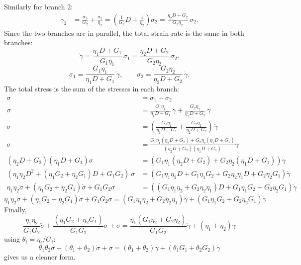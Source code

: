 Similarly for branch 2:
\begin{align*}
	\dot\gamma_2 &= \frac{\dot\sigma_2}{G_2} + \frac{\sigma_2}{\eta_2}
	= \left(\frac{1}{G_2}D + \frac{1}{\eta_2}\right)\sigma_2
	= \frac{\eta_2 D + G_2}{G_2\eta_2}\,\sigma_2.
\end{align*}
Since the two branches are in parallel, the total strain rate is the same in both branches:
\[
	\dot\gamma 
	= \frac{\eta_1 D + G_1}{G_1\eta_1}\,\sigma_1
	= \frac{\eta_2 D + G_2}{G_2\eta_2}\,\sigma_2.
\]
\[
	\sigma_1 = \frac{G_1\eta_1}{\eta_1 D + G_1}\,\dot\gamma,
	\qquad
	\sigma_2 = \frac{G_2\eta_2}{\eta_2 D + G_2}\,\dot\gamma.
\]
The total stress is the sum of the stresses in each branch:
\begin{align*}
	\sigma &= \sigma_1 + \sigma_2 \\
	\sigma &= \frac{G_1\eta_1}{\eta_1 D + G_1}\,\dot\gamma
	+ \frac{G_2\eta_2}{\eta_2 D + G_2}\,\dot\gamma \\
	\sigma &= \left(\frac{G_1\eta_1}{\eta_1 D + G_1}
	+ \frac{G_2\eta_2}{\eta_2 D + G_2} \right)\,\dot\gamma
	\\
	\sigma &= 
		\frac{G_1\eta_1(\eta_2 D + G_2)
	    + G_2\eta_2(\eta_1 D + G_1)} 
	    {(\eta_2 D + G_2)(\eta_1 D + G_1)} 
		\dot\gamma
	\\
	(\eta_2 D + G_2)(\eta_1 D + G_1) \sigma
		&= (G_1\eta_1(\eta_2 D + G_2)
	    + G_2\eta_2(\eta_1 D + G_1))
		\dot\gamma
	\\
	(\eta_1\eta_2 D^2
	+ (\eta_1 G_2 + \eta_2 G_1) D
	+ G_1 G_2)
	\ \sigma
		&= (G_1\eta_1\eta_2 D + G_1\eta_1G_2
	    + G_2\eta_2\eta_1 D + G_2\eta_2G_1)
		\dot\gamma
	\\
	\eta_1\eta_2 \ddot\sigma
	+ (\eta_1 G_2 + \eta_2 G_1) \dot\sigma
	+ G_1 G_2\sigma
		&= ((G_1\eta_1\eta_2 + G_2\eta_2\eta_1) D
	    + G_1\eta_1G_2 + G_2\eta_2G_1)
		\dot\gamma
\end{align*}
\begin{equation*}
	\eta_1\eta_2 \ddot\sigma
	+ (\eta_1 G_2 + \eta_2 G_1) \dot\sigma
	+ G_1 G_2\sigma
		= (G_1\eta_1\eta_2 + G_2\eta_2\eta_1) \ddot\gamma
	    + (G_1\eta_1G_2 + G_2\eta_2G_1)\dot\gamma	
\end{equation*}
Finally,
\begin{equation}
	\frac{\eta_1\eta_2}{G_1G_2} \ddot\sigma
	+ \frac{(\eta_1 G_2 + \eta_2 G_1)}{G_1G_2} \dot\sigma
	+ \sigma
		= \frac{\eta_1(G_1\eta_2 + G_2\eta_2)}{G_1G_2} \ddot\gamma
	    + (\eta_1 + \eta_2)\dot\gamma	
		\label{eq:two_maxwell_parallel_soln}
\end{equation}
using $\theta_i = \eta_i / G_i$:
\begin{equation}
	\theta_1 \theta_2 \ddot\sigma
	+ (\theta_1 + \theta_2) \dot\sigma
	+ \sigma
	= (\theta_1 + \theta_2) \ddot\gamma
	+ (\theta_1 G_1 + \theta_2 G_2)\dot\gamma
\end{equation}
gives us a cleaner form.

